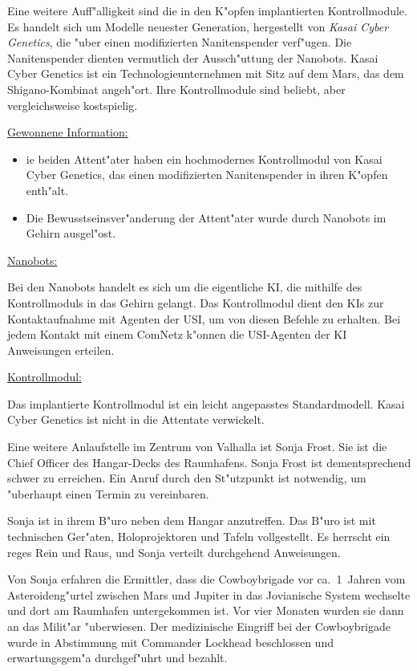 Eine weitere Auff"alligkeit sind die in den K"opfen implantierten Kontrollmodule. Es handelt sich um Modelle neuester Generation, hergestellt von \emph{Kasai Cyber Genetics}, die "uber einen modifizierten Nanitenspender verf"ugen. Die Nanitenspender dienten vermutlich der Aussch"uttung der Nanobots. Kasai Cyber Genetics ist ein Technologieunternehmen mit Sitz auf dem Mars, das dem Shigano-Kombinat angeh"ort. Ihre Kontrollmodule sind beliebt, aber vergleichsweise kostspielig.
\vfill

\begin{remarks}
	\underline{Gewonnene Information:}
	
	\begin{itemize}
		\item ie beiden Attent"ater haben ein hochmodernes Kontrollmodul von Kasai Cyber Genetics, das einen modifizierten Nanitenspender in 
			ihren K"opfen enth"alt.
		\item Die Bewusstseinsver"anderung der Attent"ater wurde durch Nanobots im Gehirn ausgel"ost.
	\end{itemize}
	
	\underline{Nanobots:}

	Bei den Nanobots handelt es sich um die eigentliche KI, die mithilfe des Kontrollmoduls in das Gehirn gelangt. Das Kontrollmodul dient den KIs zur Kontaktaufnahme mit Agenten der USI, um von diesen Befehle zu erhalten. Bei jedem Kontakt mit einem ComNetz k"onnen die USI-Agenten der KI Anweisungen erteilen.

	\underline{Kontrollmodul:}

	Das implantierte Kontrollmodul ist ein leicht angepasstes Standardmodell. Kasai Cyber Genetics ist nicht in die Attentate verwickelt.
\end{remarks}


Eine weitere Anlaufstelle im Zentrum von Valhalla ist Sonja Frost. Sie ist die Chief Officer des Hangar-Decks des Raumhafens. Sonja Frost ist dementsprechend schwer zu erreichen. Ein Anruf durch den St"utzpunkt ist notwendig, um "uberhaupt einen Termin zu vereinbaren.

Sonja ist in ihrem B"uro neben dem Hangar anzutreffen. Das B"uro ist mit technischen Ger"aten, Holoprojektoren und Tafeln vollgestellt. Es herrscht ein reges Rein und Raus, und Sonja verteilt durchgehend Anweisungen.

Von Sonja erfahren die Ermittler, dass die Cowboybrigade vor ca.~1\half~Jahren vom Asteroideng"urtel zwischen Mars und Jupiter in das Jovianische System wechselte und dort am Raumhafen untergekommen ist. Vor vier Monaten wurden sie dann an das Milit"ar "uberwiesen. Der medizinische Eingriff bei der Cowboybrigade wurde in Abstimmung mit Commander Lockhead beschlossen und erwartungsgem"a\3 durchgef"uhrt und bezahlt.

